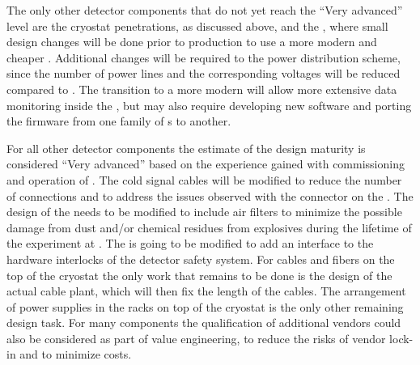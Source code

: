 The only other  detector components that do not yet
reach the ``Very advanced'' level are the cryostat penetrations, as
discussed above, and the , where small
design changes will be done prior to production to use a more
modern and cheaper . Additional changes will be required to
the power distribution scheme, since the number of power lines
and the corresponding voltages will be reduced compared to
. The transition to a more modern  will allow 
more extensive data monitoring inside the , but may
also require developing new software and porting the firmware
from one family of s to another. 

For all other detector components the estimate of the design
maturity is considered ``Very advanced'' based on the experience
gained with commissioning and operation of . The 
cold signal cables will be modified to reduce the number of
connections and to address the issues observed with the connector
on the . The design of the  needs to
be modified to include air filters to minimize the possible
damage from dust and/or chemical residues from  explosives 
during the lifetime of the experiment at .
The  is going to be modified to add an interface to
the hardware interlocks of the detector safety system. For
cables and fibers on the top of the cryostat the only work that
remains to be done is the design of the actual cable plant, 
which will then fix the length of the cables. The arrangement
of power supplies in the racks on top of the cryostat is the
only other remaining design task. For many components the
qualification of additional vendors could also be considered
as part of value engineering, to reduce the risks of vendor
lock-in and to minimize costs. 

